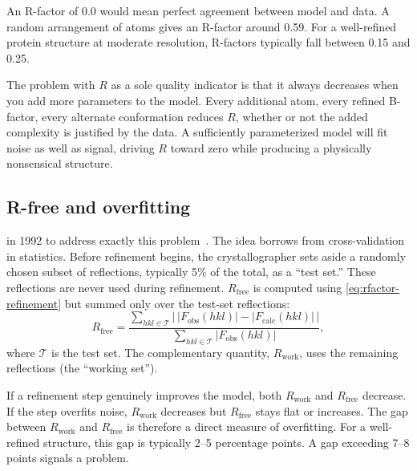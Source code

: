 An R-factor of 0.0 would mean perfect agreement between model and data.
A random arrangement of atoms gives an R-factor around 0.59. For a
well-refined protein structure at moderate resolution, R-factors
typically fall between 0.15 and 0.25.

The problem with $R$ as a sole quality indicator is that it always
decreases when you add more parameters to the model. Every additional
atom, every refined B-factor, every alternate conformation reduces $R$,
whether or not the added complexity is justified by the data. A
sufficiently parameterized model will fit noise as well as signal,
driving $R$ toward zero while producing a physically nonsensical
structure.

\subsection{R-free and overfitting}
\label{sec:rfree}

 in 1992 to
address exactly this problem~\cite{brunger1992}.
The idea borrows from cross-validation in statistics. Before refinement
begins, the crystallographer sets aside a randomly chosen subset of
reflections, typically 5\% of the total, as a ``test set.'' These
reflections are never used during refinement. $R_{\mathrm{free}}$ is
computed using \cref{eq:rfactor-refinement} but summed only over the test-set
reflections:
\begin{equation}
\label{eq:rfree}
  R_{\mathrm{free}} = \frac{\displaystyle\sum_{hkl \in \mathcal{T}}
    \bigl|\, |F_{\mathrm{obs}}(hkl)| - |F_{\mathrm{calc}}(hkl)|\, \bigr|}
           {\displaystyle\sum_{hkl \in \mathcal{T}} |F_{\mathrm{obs}}(hkl)|},
\end{equation}
where $\mathcal{T}$ is the test set. The complementary quantity,
$R_{\mathrm{work}}$, uses the remaining reflections (the ``working
set'').

If a refinement step genuinely improves the model, both $R_{\mathrm{work}}$
and $R_{\mathrm{free}}$ decrease. If the step overfits noise,
$R_{\mathrm{work}}$ decreases but $R_{\mathrm{free}}$ stays flat
or increases. The gap between $R_{\mathrm{work}}$ and
$R_{\mathrm{free}}$ is therefore a direct measure of overfitting.
For a well-refined structure, this gap is typically 2--5 percentage
points. A gap exceeding 7--8 points signals a problem.

